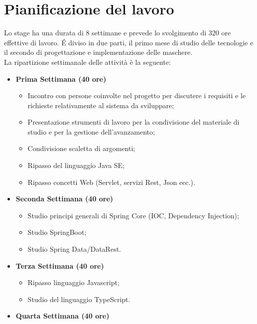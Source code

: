 
\section{Pianificazione del lavoro}
Lo stage ha una durata di 8 settimane e prevede lo svolgimento di 320 ore effettive di lavoro. É diviso in due parti, il primo mese di studio delle tecnologie e il secondo di progettazione e implementazione delle maschere.\\
La ripartizione settimanale delle attività è la seguente:
\begin{itemize}
        \item \textbf{Prima Settimana (40 ore)}
        \begin{itemize}
            \item Incontro con persone coinvolte nel progetto per discutere i requisiti e le richieste
            relativamente al sistema da sviluppare;
            \item  Presentazione strumenti di lavoro per la condivisione del materiale di studio e per la gestione
            dell’avanzamento;
            \item Condivisione scaletta di argomenti;
            \item Ripasso del linguaggio Java SE;
            \item Ripasso concetti Web (Servlet, servizi Rest, Json ecc.).
        \end{itemize}
        \item \textbf{Seconda Settimana (40 ore)} 
        \begin{itemize}
            \item Studio principi generali di Spring Core (IOC, Dependency Injection);
            \item Studio SpringBoot;
            \item Studio Spring Data/DataRest.
        \end{itemize}
        \item \textbf{Terza Settimana (40 ore)} 
        \begin{itemize}
            \item Ripasso linguaggio Javascript;
            \item Studio del linguaggio TypeScript.
        \end{itemize}
        \item \textbf{Quarta Settimana (40 ore)} 
        \begin{itemize}

\end{itemize}
\end{itemize}
